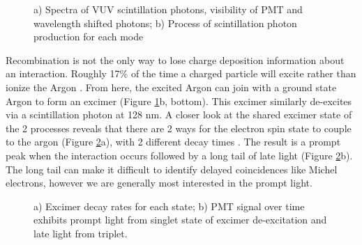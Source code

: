 \begin{figure}[h!]
\centering
{}
\hspace{1 mm}
\caption{ a) Spectra of VUV scintillation photons, visibility of PMT and wavelength shifted photons; b) Process of scintillation photon production for each mode  } 
\label{fig:decay}
\end{figure}


\par Recombination is not the only way to lose charge deposition information about an interaction. Roughly 17\% of the time a charged particle will excite rather than ionize the Argon \cite{bib:sorel}. From here, the excited Argon can join with a ground state Argon to form an excimer (Figure \ref{fig:decay}b, bottom). This excimer similarly de-excites via a scintillation photon at 128 nm.  A closer look at the shared excimer state of the 2 processes reveals that there are 2 ways for the electron spin state to couple to the argon (Figure \ref{fig:light}a), with 2 different decay times \cite{bib:lumin}. The result is a prompt peak when the interaction occurs followed by a long tail of late light (Figure \ref{fig:light}b).  The long tail can make it difficult to identify delayed coincidences like Michel electrons, however we are generally most interested in the prompt light. 
\begin{figure}[h!]
\centering
{}
\hspace{2 mm}
\caption{ a) Excimer decay rates for each state; b) PMT signal over time exhibits prompt light from singlet state of excimer de-excitation and late light from triplet. } 
\label{fig:light}
\end{figure}


